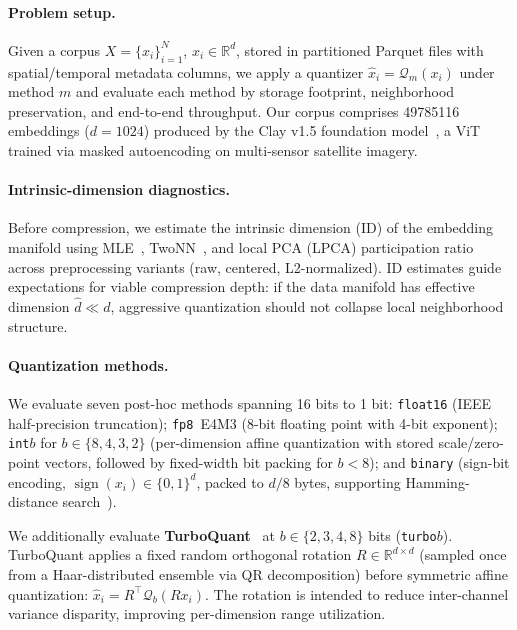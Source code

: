\documentclass{article}
\begin{document}
\paragraph{Problem setup.}

Given a corpus $X = \{x_i\}_{i=1}^N$, $x_i \in \mathbb{R}^d$, stored in partitioned Parquet files with spatial/temporal metadata columns, we apply a quantizer $\hat{x}_i = \mathcal{Q}_m(x_i)$ under method $m$ and evaluate each method by storage footprint, neighborhood preservation, and end-to-end throughput.
Our corpus comprises \num{49785116} embeddings ($d{=}1024$) produced by the Clay v1.5 foundation model~\citep{clay2025model}, a ViT trained via masked autoencoding on multi-sensor satellite imagery.

\paragraph{Intrinsic-dimension diagnostics.}

Before compression, we estimate the intrinsic dimension (ID) of the embedding manifold using MLE~\citep{levina2004id}, TwoNN~\citep{facco2017twonn}, and local PCA (LPCA) participation ratio across preprocessing variants (raw, centered, L2-normalized).
ID estimates guide expectations for viable compression depth: if the data manifold has effective dimension $\hat{d} \ll d$, aggressive quantization should not collapse local neighborhood structure.

\paragraph{Quantization methods.}

We evaluate seven post-hoc methods spanning 16 bits to 1 bit:
\texttt{float16} (IEEE half-precision truncation);
\texttt{fp8}~E4M3 (8-bit floating point with 4-bit exponent);
\texttt{int}$b$ for $b \in \{8,4,3,2\}$ (per-dimension affine quantization with stored scale/zero-point vectors, followed by fixed-width bit packing for $b < 8$); and
\texttt{binary} (sign-bit encoding, $\operatorname{sign}(x_i) \in \{0,1\}^d$, packed to $d/8$ bytes, supporting Hamming-distance search~\citep{wang2018binary}).

We additionally evaluate \textbf{TurboQuant}~\citep{zandieh2025turboquant} at $b \in \{2,3,4,8\}$ bits (\texttt{turbo}$b$).
TurboQuant applies a fixed random orthogonal rotation $R \in \mathbb{R}^{d \times d}$ (sampled once from a Haar-distributed ensemble via QR decomposition) before symmetric affine quantization: $\hat{x}_i = R^\top \mathcal{Q}_b(R x_i)$.
The rotation is intended to reduce inter-channel variance disparity, improving per-dimension range utilization.
\end{document}
